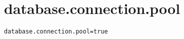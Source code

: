 \section{database.connection.pool}
\label{configuration:DatabaseConnectionPool}
\AvailableInJavaOnly{\TODO}
\begin{lstlisting}[style=Props,caption={Usage example for \textit{database.connection.pool}}]
database.connection.pool=true
\end{lstlisting}